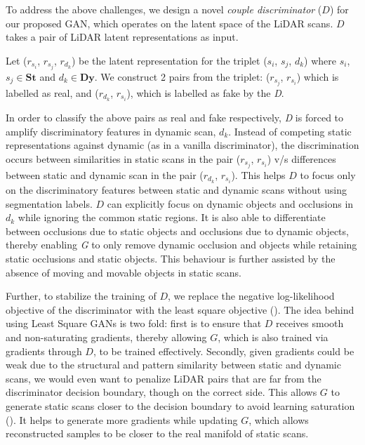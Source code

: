 To address the above challenges, we design a novel \textit{couple discriminator} ($D$) for our proposed GAN, which operates on the latent space of the LiDAR scans. $D$ takes a pair of LiDAR latent representations as input.

Let ($r_{s_i}$, $r_{s_j}$, $r_{d_k}$) be the latent representation for the triplet (${s_i}$, ${s_j}$, ${d_k}$) where $s_i$, $s_j \in \textbf{St}$ and $d_k \in \textbf{Dy}$. We construct 2 pairs from the triplet: ($r_{s_j}$, $r_{s_i}$) which is labelled as real, and ($r_{d_k}$, $r_{s_i}$), which is labelled as fake by the \textit{D}.

In order to classify the above pairs as real and fake respectively, \textit{D} is forced to  amplify discriminatory features in dynamic scan, $d_k$. Instead of competing static representations against dynamic (as in a vanilla discriminator), the discrimination occurs between similarities in static scans in the  pair ($r_{s_j}$, $r_{s_i}$) v/s differences between static and dynamic scan in the pair ($r_{d_k}$, $r_{s_i}$). This helps $D$ to focus only on the discriminatory features between static and dynamic scans without using segmentation labels. $D$ can explicitly focus on dynamic objects and occlusions in $d_k$ while ignoring the common static regions. It is also able to differentiate between occlusions due to static objects and occlusions due to dynamic objects, thereby enabling \textit{G} to only remove dynamic occlusion and objects while retaining static occlusions and static objects. This behaviour is further assisted by the absence of moving and movable objects in static scans.

Further, to stabilize the training of $D$, we replace the negative log-likelihood objective of the discriminator with the least square objective (\citet{mao2017least}). The idea behind using Least Square GANs is two fold: first is to ensure that $D$ receives smooth and non-saturating gradients, thereby allowing $G$, which is also trained via gradients through $D$, to be trained effectively. Secondly, given gradients could be weak due to the structural and pattern similarity between static and dynamic scans, we would even want to penalize LiDAR pairs that are far from the discriminator decision boundary,  though on the correct side. This allows $G$ to generate static scans closer to the decision boundary to avoid learning saturation (\citet{mao2017least}). It helps to generate more gradients while updating $G$, which allows reconstructed samples to be closer to the real manifold of static scans.

